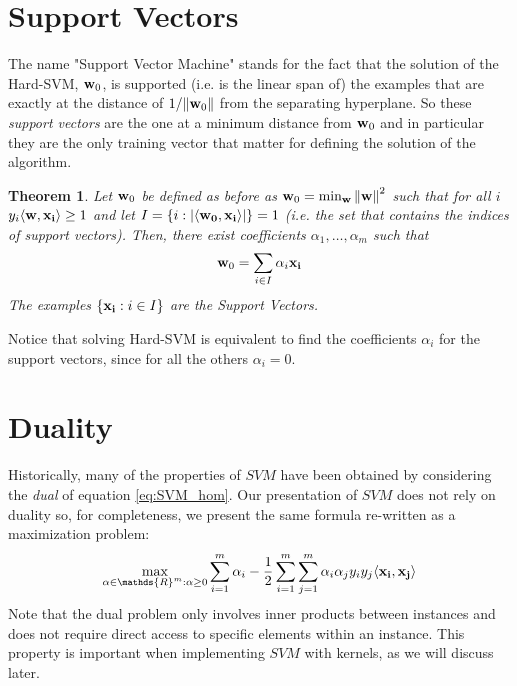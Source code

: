 \documentclass[12pt]{report}
\theoremstyle{plain}
\newtheorem{theorem}{Theorem}[chapter]
\newcommand\sprod[2]{\langle \vb{#1},\vb{#2}\rangle}
\begin{document}
\begin{flushleft}
\section{Support Vectors}
The name "Support Vector Machine" stands for the fact that the solution of the Hard-SVM, $\vb{w}_0$, is supported (i.e. is the linear span of) the examples that are exactly at the distance of $1/\norm{\vb{w}_0}$ from the separating hyperplane. So these \textit{support vectors} are the one at a minimum distance from $\vb{w}_0$ and in particular they are the only training vector that matter for defining the solution of the algorithm.\\
\begin{theorem}
	Let $\vb{w}_0$ be defined as before as $\vb{w}_0=\min_{\vb{w}}\norm{\vb{w}}^2$ such that for all $i$ $y_i\sprod{w}{x_i}\geq 1$ and let $I=\left\{i:\abs{\sprod{w_0}{x_i}}\right\}=1$ (i.e. the set that contains the indices of support vectors). Then, there exist coefficients $\alpha_1,\dots,\alpha_m$ such that
	\[ \vb{w}_0=\sum_{i\in I}\alpha_i\vb{x_i} \]
	The examples $\left\{\vb{x_i}:i\in I\right\}$ are the Support Vectors.
\end{theorem}
Notice that solving Hard-SVM is equivalent to find the coefficients $\alpha_i$ for the support vectors, since for all the others $\alpha_i=0$.

\section{Duality}
Historically, many of the properties of $SVM$ have been obtained by considering the \textit{dual} of equation \ref{eq:SVM_hom}. Our presentation of $SVM$ does not rely on duality so, for completeness, we present the same formula re-written as a maximization problem:
\[ \max_{\vb{\alpha}\in\mathds{R}^m:\vb{\alpha}\geq 0}\sum_{i=1}^m\alpha_i-\frac{1}{2}\sum_{i=1}^m\sum_{j=1}^m\alpha_i\alpha_jy_iy_j\sprod{x_i}{x_j} \]
Note that the dual problem only involves inner products between instances and does not require direct access to specific elements within an instance. This property is important when implementing $SVM$ with kernels, as we will discuss later.


\end{flushleft}
\end{document}
